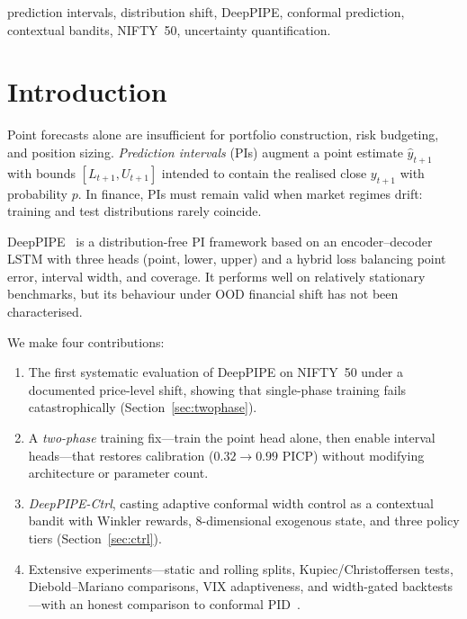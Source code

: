 \documentclass[conference]{IEEEtran}
\begin{document}
\begin{IEEEkeywords}
prediction intervals, distribution shift, DeepPIPE, conformal prediction, contextual bandits,
NIFTY~50, uncertainty quantification.
\end{IEEEkeywords}

\section{Introduction}
\label{sec:intro}
Point forecasts alone are insufficient for portfolio construction, risk budgeting, and position
sizing. \emph{Prediction intervals} (PIs) augment a point estimate $\hat{y}_{t+1}$ with bounds
$[L_{t+1},U_{t+1}]$ intended to contain the realised close $y_{t+1}$ with probability $p$. In
finance, PIs must remain valid when market regimes drift: training and test distributions rarely
coincide.

DeepPIPE~\cite{wang2020deeppipe} is a distribution-free PI framework based on an encoder--decoder
LSTM with three heads (point, lower, upper) and a hybrid loss balancing point error, interval
width, and coverage. It performs well on relatively stationary benchmarks, but its behaviour under
OOD financial shift has not been characterised.

We make four contributions:
\begin{enumerate}
  \item The first systematic evaluation of DeepPIPE on NIFTY~50 under a documented price-level
        shift, showing that single-phase training fails catastrophically
        (Section~\ref{sec:twophase}).
  \item A \emph{two-phase} training fix---train the point head alone, then enable interval
        heads---that restores calibration ($0.32\rightarrow0.99$ PICP) without modifying
        architecture or parameter count.
  \item \emph{DeepPIPE-Ctrl}, casting adaptive conformal width control as a contextual bandit
        with Winkler rewards, 8-dimensional exogenous state, and three policy tiers
        (Section~\ref{sec:ctrl}).
  \item Extensive experiments---static and rolling splits, Kupiec/Christoffersen tests,
        Diebold--Mariano comparisons, VIX adaptiveness, and width-gated backtests---with an honest
        comparison to conformal PID~\cite{angelopoulos2023pid}.
\end{enumerate}
\end{document}
